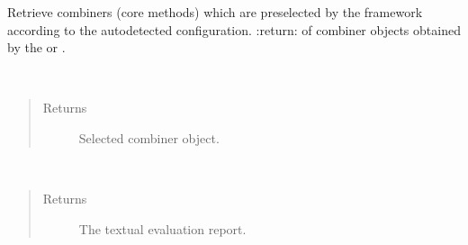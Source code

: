 \documentclass[letterpaper,10pt,english]{sphinxmanual}
\begin{document}
\begin{fulllineitems}
\begin{fulllineitems}
\begin{quote}
\begin{description}
\end{description}\end{quote}

\end{fulllineitems}


\begin{fulllineitems}
\label{\detokenize{pusion.control.decision_processor:pusion.control.decision_processor.DecisionProcessor.get_combiners}}
\sphinxAtStartPar
Retrieve combiners (core methods) which are preselected by the framework according to the auto\sphinxhyphen{}detected
configuration.
:return:  of combiner objects obtained by the  or .

\end{fulllineitems}


\begin{fulllineitems}
\label{\detokenize{pusion.control.decision_processor:pusion.control.decision_processor.DecisionProcessor.get_combiner}}~\begin{quote}\begin{description}
\item[{Returns}] \leavevmode
\sphinxAtStartPar
Selected combiner object.

\end{description}\end{quote}

\end{fulllineitems}


\begin{fulllineitems}
\label{\detokenize{pusion.control.decision_processor:pusion.control.decision_processor.DecisionProcessor.report}}~\begin{quote}\begin{description}
\item[{Returns}] \leavevmode
\sphinxAtStartPar
The textual evaluation report.


\end{description}
\end{quote}
\end{fulllineitems}
\end{fulllineitems}
\end{document}
